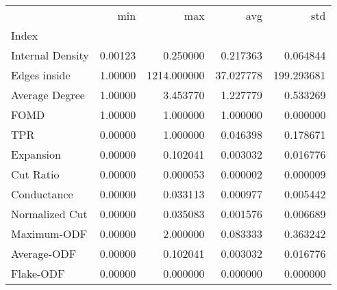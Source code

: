 \begin{tabular}{lrrrr}
\toprule
{} &      min &          max &        avg &         std \\
Index            &          &              &            &             \\
\midrule
Internal Density &  0.00123 &     0.250000 &   0.217363 &    0.064844 \\
Edges inside     &  1.00000 &  1214.000000 &  37.027778 &  199.293681 \\
Average Degree   &  1.00000 &     3.453770 &   1.227779 &    0.533269 \\
FOMD             &  1.00000 &     1.000000 &   1.000000 &    0.000000 \\
TPR              &  0.00000 &     1.000000 &   0.046398 &    0.178671 \\
Expansion        &  0.00000 &     0.102041 &   0.003032 &    0.016776 \\
Cut Ratio        &  0.00000 &     0.000053 &   0.000002 &    0.000009 \\
Conductance      &  0.00000 &     0.033113 &   0.000977 &    0.005442 \\
Normalized Cut   &  0.00000 &     0.035083 &   0.001576 &    0.006689 \\
Maximum-ODF      &  0.00000 &     2.000000 &   0.083333 &    0.363242 \\
Average-ODF      &  0.00000 &     0.102041 &   0.003032 &    0.016776 \\
Flake-ODF        &  0.00000 &     0.000000 &   0.000000 &    0.000000 \\
\bottomrule
\end{tabular}
